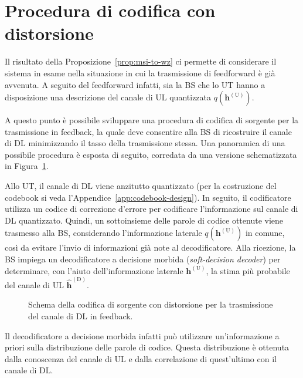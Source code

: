 \section{Procedura di codifica con distorsione}
\label{sec:procedure-with-distortion}

Il risultato della Proposizione~\ref{prop:msi-to-wz} ci permette di considerare
il sistema in esame nella situazione in cui la trasmissione di feedforward è
già avvenuta. A seguito del feedforward infatti, sia la BS che lo UT hanno a
disposizione una descrizione del canale di UL quantizzata
\(q(\bm{h}^\mathrm{(U)})\).

A questo punto è possibile sviluppare una procedura di codifica di sorgente per
la trasmissione in feedback, la quale deve consentire alla BS di ricostruire il
canale di DL minimizzando il tasso della trasmissione stessa. Una panoramica di
una possibile procedura è esposta di seguito, corredata da una versione
schematizzata in Figura~\ref{fig:procedure-schema}.

Allo UT, il canale di DL viene anzitutto quantizzato (per la costruzione del
codebook si veda l'Appendice~\ref{app:codebook-design}). In seguito, il
codificatore utilizza un codice di correzione d'errore per codificare
l'informazione sul canale di DL quantizzato. Quindi, un sottoinsieme delle
parole di codice ottenute viene trasmesso alla BS, considerando l'informazione
laterale \(q(\bm{h}^\mathrm{(U)})\) in comune, così da evitare l'invio di
informazioni già note al decodificatore. Alla ricezione, la BS impiega un
decodificatore a decisione morbida (\textit{soft-decision decoder}) per
determinare, con l'aiuto dell'informazione laterale \(\bm{h}^\mathrm{(U)}\), la
stima più probabile del canale di UL \(\hat{\bm{h}}^\mathrm{(D)}\).
\begin{figure}[ht]
    \centering
    
    \caption{
        Schema della codifica di sorgente con distorsione per la trasmissione
        del canale di DL in feedback.
    }
    \label{fig:procedure-schema}
\end{figure}
\newline
Il decodificatore a decisione morbida infatti può utilizzare un'informazione a
priori sulla distribuzione delle parole di codice. Questa distribuzione è
ottenuta dalla conoscenza del canale di UL e dalla correlazione di quest'ultimo
con il canale di DL.
